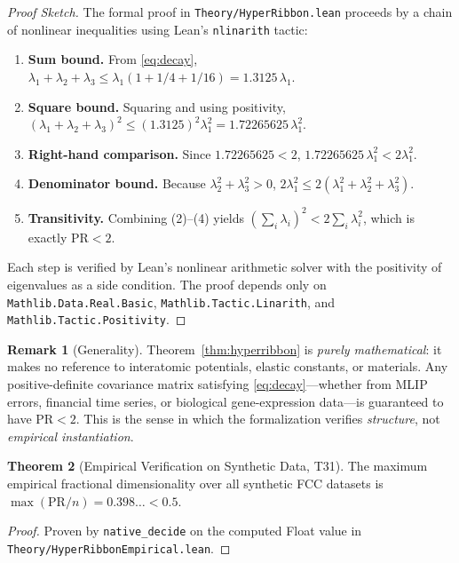 \documentclass[11pt,a4paper]{article}
\theoremstyle{definition}
\newtheorem{theorem}{Theorem}[section]
\newtheorem{remark}[theorem]{Remark}
\theoremstyle{plain}
\begin{document}
\begin{proof}[Proof Sketch]
The formal proof in \texttt{Theory/HyperRibbon.lean} proceeds by a chain of nonlinear inequalities using Lean's \texttt{nlinarith} tactic:
\begin{enumerate}
\item \textbf{Sum bound.} From \eqref{eq:decay},
$\lambda_1 + \lambda_2 + \lambda_3 \leq \lambda_1(1 + 1/4 + 1/16) = 1.3125\,\lambda_1$.
\item \textbf{Square bound.} Squaring and using positivity,
$(\lambda_1 + \lambda_2 + \lambda_3)^2 \leq (1.3125)^2 \lambda_1^2 = 1.72265625\,\lambda_1^2$.
\item \textbf{Right-hand comparison.} Since $1.72265625 < 2$,
$1.72265625\,\lambda_1^2 < 2\lambda_1^2$.
\item \textbf{Denominator bound.} Because $\lambda_2^2 + \lambda_3^2 > 0$,
$2\lambda_1^2 \leq 2(\lambda_1^2 + \lambda_2^2 + \lambda_3^2)$.
\item \textbf{Transitivity.} Combining (2)--(4) yields
$(\sum_i \lambda_i)^2 < 2 \sum_i \lambda_i^2$,
which is exactly $\mathrm{PR} < 2$.
\end{enumerate}
Each step is verified by Lean's nonlinear arithmetic solver with the positivity of eigenvalues as a side condition. The proof depends only on \texttt{Mathlib.Data.Real.Basic}, \texttt{Mathlib.Tactic.Linarith}, and \texttt{Mathlib.Tactic.Positivity}.
\end{proof}

\begin{remark}[Generality]
\label{rem:generality}
Theorem~\ref{thm:hyperribbon} is \emph{purely mathematical}: it makes no reference to interatomic potentials, elastic constants, or materials. Any positive-definite covariance matrix satisfying \eqref{eq:decay}---whether from MLIP errors, financial time series, or biological gene-expression data---is guaranteed to have $\mathrm{PR} < 2$. This is the sense in which the formalization verifies \emph{structure}, not \emph{empirical instantiation}.
\end{remark}

\begin{theorem}[Empirical Verification on Synthetic Data, T31]
\label{thm:empirical}
The maximum empirical fractional dimensionality over all synthetic FCC datasets is $\max(\mathrm{PR}/n) = 0.398\ldots < 0.5$.
\end{theorem}

\begin{proof}
Proven by \texttt{native\_decide} on the computed Float value in \texttt{Theory/HyperRibbonEmpirical.lean}.
\end{proof}
\end{document}
